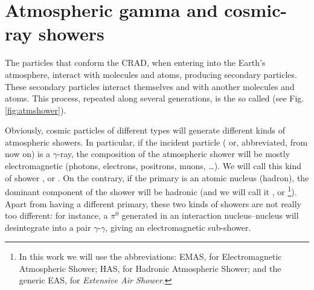 

\chapter{Atmospheric gamma and cosmic-ray showers}
\label{chapter:atmshowers}

The particles that conform the CRAD, when entering into the Earth's
atmosphere, interact with molecules and atoms, producing secondary
particles. These secondary particles interact themselves and with
another molecules and atoms. This process, repeated along several
generations, is the so called \emph{} (see Fig.
\ref{fig:atmshower}).

Obviously, cosmic particles of different types will generate different
kinds of atmospheric showers. In particular, if the incident particle
(\emph{} or, abbreviated,
\emph{} from now on) is a
$\gamma$-ray, the composition of the atmospheric shower will be mostly
electromagnetic (photons, electrons, positrons, muons, \ldots). We
will call this kind of shower \emph{}, or \emph{}. On the contrary, if the
primary is an atomic nucleus (hadron), the dominant component of the
shower will be hadronic (and we will call it \emph{}, or \emph{}\footnote{In this work
  we will use the abbreviations: EMAS, for Electromagnetic Atmospheric
  Shower; HAS, for Hadronic Atmospheric Shower; and the generic EAS,
  for \emph{Extensive Air Shower}.}). Apart from having a different
primary, these two kinds of showers are not really too different: for
instance, a $\pi^{0}$ generated in an interaction nucleus--nucleus
will desintegrate into a pair $\gamma$-$\gamma$, giving an
electromagnetic sub-shower.

\atmshowerfig  %

\processesfig  %

